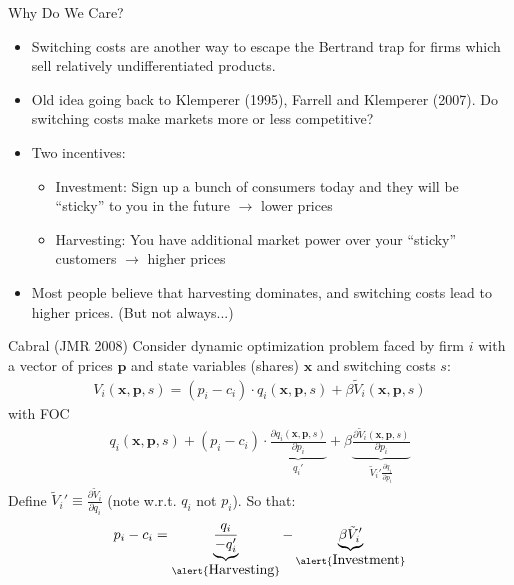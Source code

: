 \documentclass[xcolor=pdftex,dvipsnames,table,mathserif]{beamer}
\begin{document}
\begin{frame}{Why Do We Care?}
\begin{itemize}
\item Switching costs are another way to escape the Bertrand trap for firms which sell relatively undifferentiated products.
\item Old idea going back to Klemperer (1995), Farrell and Klemperer (2007). Do switching costs make markets more or less competitive?
\item Two incentives:
\begin{itemize}
\item \alert{Investment}: Sign up a bunch of consumers today and they will be ``sticky'' to you in the future $\rightarrow$ \alert{lower prices}
\item \alert{Harvesting}: You have additional market power over your ``sticky'' customers $\rightarrow$ \alert{higher prices}
\end{itemize}
\item Most people believe that \alert{harvesting} dominates, and switching costs lead to \alert{higher} prices. (But not always...)
\end{itemize}
\end{frame} 

\begin{frame}{Cabral (JMR 2008)}
Consider dynamic optimization problem faced by firm $i$ with a vector of prices $\mathbf{p}$ and state variables (shares) $\mathbf{x}$ and switching costs $s$:
\begin{eqnarray*}
V_i(\mathbf{x},\mathbf{p},s) = (p_i - c_i) \cdot q_i(\mathbf{x},\mathbf{p},s) + \beta \tilde{V}_i(\mathbf{x},\mathbf{p},s)
\end{eqnarray*}
with FOC
\begin{eqnarray*}
q_i(\mathbf{x},\mathbf{p},s) +  (p_i - c_i) \cdot \underbrace{\frac{\partial q_i(\mathbf{x},\mathbf{p},s)}{\partial p_i}}_{q_i'} +  \beta  \underbrace{\frac{\partial \tilde{V}_i(\mathbf{x},\mathbf{p},s)}{\partial p_i}}_{\tilde{V}_i' \frac{\partial q_i}{\partial p_i}}
\end{eqnarray*}
Define $\tilde{V}_i' \equiv \frac{\partial \tilde{V}_i}{\partial q_i}$ (note w.r.t. $q_i$ not $p_i$). So that:
\begin{eqnarray*}
p_i - c_i = \underbrace{\frac{q_i}{-q_i'}}_{\alert{\mbox{Harvesting}}} - \underbrace{\beta \tilde{V}_i'}_{\alert{\mbox{Investment}}}
\end{eqnarray*}
\end{frame} 
\end{document}
